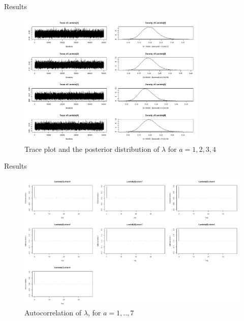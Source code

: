 \documentclass[10pt]{beamer} %
\begin{document}
\begin{frame}{Results}
    \begin{figure}[h]
    \centering
    \includegraphics[width=0.8\textwidth]{Lambda1.JPG}
    \caption{Trace plot and the posterior distribution of $\lambda$ for $a=1,2,3,4$}
    \label{Lambda}
\end{figure}
\end{frame}

\begin{frame}{Results}
    \begin{figure}[H]
    \centering
    \includegraphics[width=1\textwidth ]{Auto_cor_LAMBDA.png}
    \caption{Autocorrelation of $\lambda$, for $a=1,..,7$}
    \label{autocorLambda}
\end{figure}
\end{frame}
\end{document}
